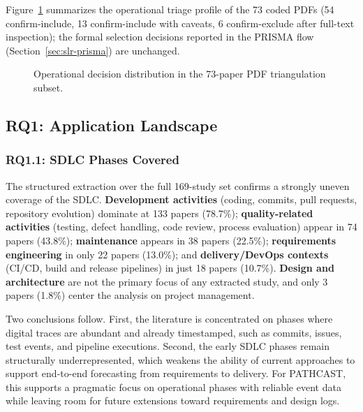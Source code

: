 Figure~\ref{fig:pdf-decision-dist} summarizes the operational triage profile
of the 73 coded PDFs (54 confirm-include, 13 confirm-include with
caveats, 6 confirm-exclude after full-text inspection); the formal selection
decisions reported in the PRISMA flow (Section~\ref{sec:slr-prisma}) are
unchanged.

\begin{figure}[tbp]
\centering
{}
\caption{Operational decision distribution in the 73-paper PDF triangulation subset.}
\label{fig:pdf-decision-dist}
\end{figure}

\subsection{RQ1: Application Landscape}
\label{sec:slr-rq1}

\subsubsection{RQ1.1: SDLC Phases Covered}

The structured extraction over the full 169-study set confirms a strongly
uneven coverage of the SDLC. \textbf{Development activities} (coding,
commits, pull requests, repository evolution) dominate at 133 papers
(78.7\%); \textbf{quality-related activities} (testing, defect handling, code
review, process evaluation) appear in 74 papers (43.8\%);
\textbf{maintenance} appears in 38 papers (22.5\%);
\textbf{requirements engineering} in only 22 papers (13.0\%); and
\textbf{delivery/DevOps contexts} (CI/CD, build and release pipelines) in
just 18 papers (10.7\%). \textbf{Design and architecture} are not the primary
focus of any extracted study, and only 3 papers (1.8\%) center the analysis
on project management.

Two conclusions follow. First, the literature is concentrated on phases where
digital traces are abundant and already timestamped, such as commits, issues,
test events, and pipeline executions. Second, the early SDLC phases remain
structurally underrepresented, which weakens the ability of current
approaches to support end-to-end forecasting from requirements to delivery.
For PATHCAST, this supports a pragmatic focus on operational phases with
reliable event data while leaving room for future extensions toward
requirements and design logs.

